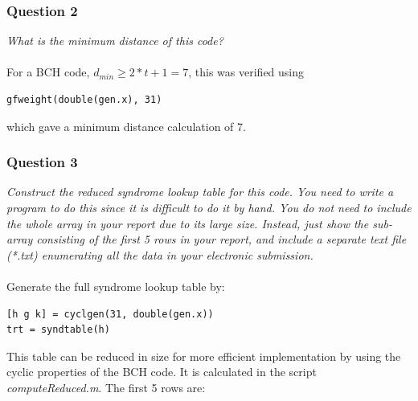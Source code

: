 \documentclass[a4paper]{article}
\begin{document}
\subsubsection{Question 2} \textit{What is the minimum distance of this code?} \\
\\
For a BCH code, $d_{min} \geq 2*t + 1 = 7$, this was verified using 
\begin{lstlisting}
gfweight(double(gen.x), 31)
\end{lstlisting}
which gave a minimum distance calculation of 7.

\subsubsection{Question 3} \textit{Construct the reduced syndrome lookup table for this code. You need to write a program to do this since it is difficult to do it by hand. You do not need to include the whole array in your report due to its large size. Instead, just show the sub-array consisting of the first 5 rows in your report, and include a separate text file (*.txt) enumerating all the data in your electronic submission.} \\
\\
Generate the full syndrome lookup table by:
\begin{lstlisting}
[h g k] = cyclgen(31, double(gen.x))
trt = syndtable(h)
\end{lstlisting}
This table can be reduced in size for more efficient implementation by using the cyclic properties of the BCH code. It is calculated in the script \textit{computeReduced.m}. The first 5 rows are:\\
\end{document}
